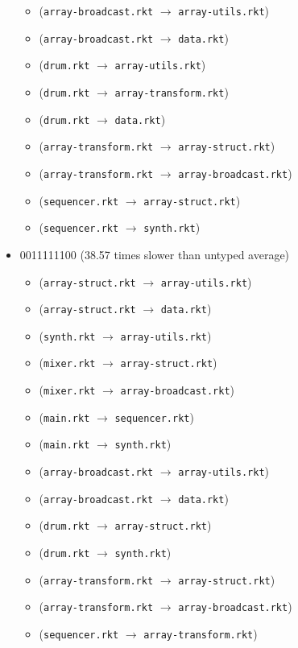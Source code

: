 \documentclass{article}
\newcommand{\mono}[1]{\texttt{#1}}
\begin{document}
\begin{itemize}
\begin{itemize}
  \item (\mono{array-broadcast.rkt} $\rightarrow$ \mono{array-utils.rkt})
  \item (\mono{array-broadcast.rkt} $\rightarrow$ \mono{data.rkt})
  \item (\mono{drum.rkt} $\rightarrow$ \mono{array-utils.rkt})
  \item (\mono{drum.rkt} $\rightarrow$ \mono{array-transform.rkt})
  \item (\mono{drum.rkt} $\rightarrow$ \mono{data.rkt})
  \item (\mono{array-transform.rkt} $\rightarrow$ \mono{array-struct.rkt})
  \item (\mono{array-transform.rkt} $\rightarrow$ \mono{array-broadcast.rkt})
  \item (\mono{sequencer.rkt} $\rightarrow$ \mono{array-struct.rkt})
  \item (\mono{sequencer.rkt} $\rightarrow$ \mono{synth.rkt})
  \end{itemize}
\item 0011111100 (38.57 times slower than untyped average)
  \begin{itemize}
  \item (\mono{array-struct.rkt} $\rightarrow$ \mono{array-utils.rkt})
  \item (\mono{array-struct.rkt} $\rightarrow$ \mono{data.rkt})
  \item (\mono{synth.rkt} $\rightarrow$ \mono{array-utils.rkt})
  \item (\mono{mixer.rkt} $\rightarrow$ \mono{array-struct.rkt})
  \item (\mono{mixer.rkt} $\rightarrow$ \mono{array-broadcast.rkt})
  \item (\mono{main.rkt} $\rightarrow$ \mono{sequencer.rkt})
  \item (\mono{main.rkt} $\rightarrow$ \mono{synth.rkt})
  \item (\mono{array-broadcast.rkt} $\rightarrow$ \mono{array-utils.rkt})
  \item (\mono{array-broadcast.rkt} $\rightarrow$ \mono{data.rkt})
  \item (\mono{drum.rkt} $\rightarrow$ \mono{array-struct.rkt})
  \item (\mono{drum.rkt} $\rightarrow$ \mono{synth.rkt})
  \item (\mono{array-transform.rkt} $\rightarrow$ \mono{array-struct.rkt})
  \item (\mono{array-transform.rkt} $\rightarrow$ \mono{array-broadcast.rkt})
  \item (\mono{sequencer.rkt} $\rightarrow$ \mono{array-transform.rkt})

\end{itemize}
\end{itemize}
\end{document}
